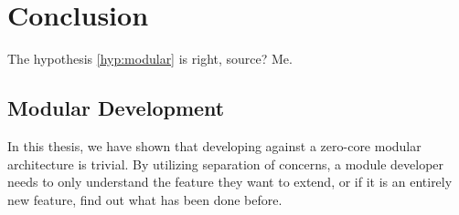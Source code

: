 \chapter{Conclusion} \label{cha:conclusion}

The hypothesis \ref{hyp:modular} is right, source? Me.

\section{Modular Development}

In this thesis, we have shown that developing against a zero-core modular
architecture is trivial. By utilizing separation of concerns, a module developer
needs to only understand the feature they want to extend, or if it is an
entirely new feature, find out what has been done before.

